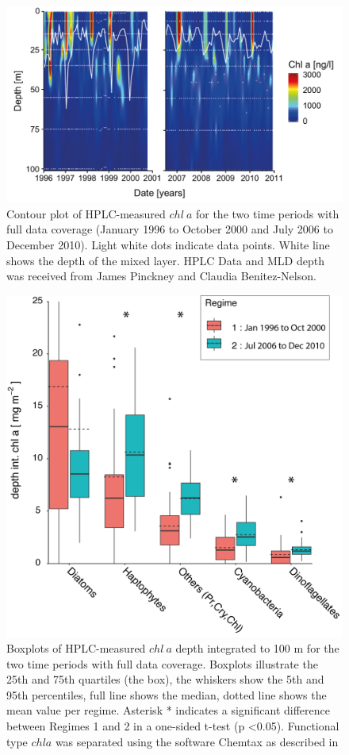 \begin{figure}
\centering
\includegraphics[trim = 0mm 0mm 0mm 0mm, clip, width=.9\linewidth]{./Chp2-Pre/Pinckneyetal2015_TotChlAcontoursMLD.png}
\caption[Scheme]{\small {Contour plot of HPLC-measured $chl~a$ for the two time periods with full data coverage (January 1996 to October 2000 and July 2006 to December 2010). Light white dots indicate data points. White line shows the depth of the mixed layer. HPLC Data and MLD depth was received from James Pinckney and Claudia Benitez-Nelson.}} %
\label{TChlAPinckney}
\end{figure}


\begin{figure}
\centering
\includegraphics[trim = 0mm 0mm 0mm 0mm, clip, width=.7\linewidth]{./Chp2-Pre/PFT_groupsAsset511.png}
\caption[Scheme]{\small {Boxplots of HPLC-measured $chl~a$ depth integrated to 100 m for the two time periods with full data coverage. Boxplots illustrate the 25th and 75th quartiles (the box), the whiskers show the 5th and 95th percentiles, full line shows the median, dotted line shows the mean value per regime. Asterisk * indicates a significant difference between Regimes 1 and 2 in a one-sided t-test (p \textless	 0.05). 
Functional type $chl a$ was separated using the software Chemtax as described in \citet{Pinckney2015}}}
\label{PFTcariaco}
\end{figure}

